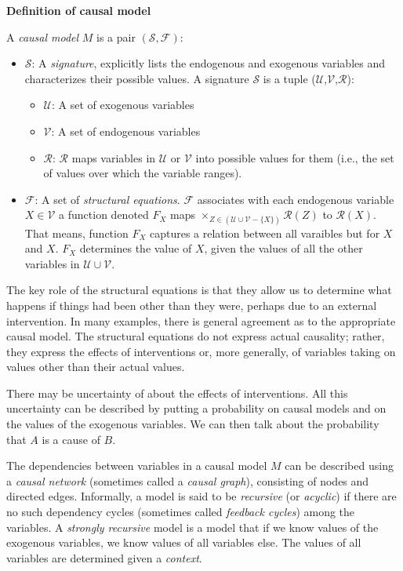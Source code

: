\documentclass[UTF8]{ctexbook}
\begin{document}
\begin{mdframed}
\textbf{Definition of causal model}

A \textit{causal model} $M$ is a pair $(\mathcal{S}, \mathcal{F})$:
\begin{itemize}
	\item $\mathcal{S}$: A \textit{signature}, explicitly lists the endogenous and exogenous variables and characterizes their possible values. A signature $\mathcal{S}$ is a tuple ($\mathcal{U}$,$\mathcal{V}$,$\mathcal{R}$):
	\begin{itemize}
		\item $\mathcal{U}$: A set of exogenous variables
		\item $\mathcal{V}$: A set of endogenous variables
		\item $\mathcal{R}$: $\mathcal{R}$ maps variables in $\mathcal{U}$ or $\mathcal{V}$ into possible values for them (i.e., the set of values over which the variable ranges).
	\end{itemize}
	\item $\mathcal{F}$: A set of \textit{structural equations}. $\mathcal{F}$ associates with each endogenous variable $X \in \mathcal{V}$ a function denoted $F_{X}$ maps $\times_{Z \in(\mathcal{U} \cup \mathcal{V}-\{X\})} \mathcal{R}(Z)$ to $\mathcal{R}(X)$. That means, function $F_{X}$ captures a relation between all varaibles but for $X$ and $X$. $F_{X}$ determines the value of $X$, given the values of all the other variables in $\mathcal{U} \cup \mathcal{V}$. 
\end{itemize}
\end{mdframed}
	
The key role of the structural equations is that they allow us to determine what happens if things had been other than they were, perhaps due to an external intervention. In many examples, there is general agreement as to the appropriate causal model. The structural equations do not express actual causality; rather, they express the effects of interventions or, more generally, of variables taking on values other than their actual values. 

There may be  uncertainty of about the effects of interventions. All this uncertainty can be described by putting a probability on causal models and on the values of the exogenous variables. We can then talk about the probability that $A$ is a cause of $B$.

The dependencies between variables in a causal model $M$ can be described using a \textit{causal network} (sometimes called a \textit{causal graph}), consisting of nodes and directed edges. Informally, a model is said to be \textit{recursive} (or \textit{acyclic}) if there are no such dependency cycles (sometimes called \textit{feedback cycles}) among the variables. A \textit{strongly recursive} model is a model that if we know values of the exogenous variables, we know values of all variables else. The values of all variables are determined given a \textit{context}.
\end{document}
